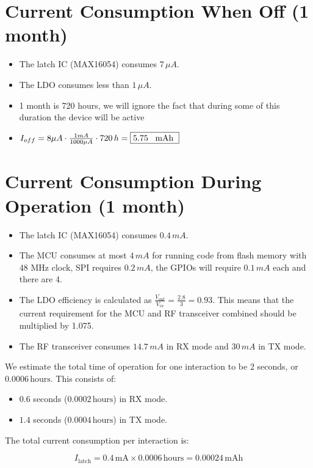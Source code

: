 \documentclass{article}
\begin{document}
\section{Current Consumption When Off (1 month)}
\begin{itemize}
    \item The latch IC (MAX16054) consumes \(7 \, \mu A\).
    \item The LDO consumes less than \(1 \, \mu A\).
    \item 1 month is 720 hours, we will ignore the fact that during some of this duration the device will be active
    \item \(I_{off} = 8 \mu A \cdot \frac{1 mA}{1000 \mu A} \cdot 720 \,  h = \fbox{5.75 \, mAh } \)
\end{itemize}

\section{Current Consumption During Operation (1 month)}
\begin{itemize}
    \item The latch IC (MAX16054) consumes \(0.4 \, mA\).
    \item The MCU consumes at most \(4 \, mA\) for running code from flash memory with 48 MHz clock, SPI requires \(0.2 \, mA\), the GPIOs will require \(0.1 \, mA\) each and there are 4.
    \item The LDO efficiency is calculated as \(\frac{V_{out}}{V_{in}} = \frac{2.8}{3} = 0.93\). This means that the current requirement for the MCU and RF transceiver combined should be multiplied by 1.075. 
    \item The RF transceiver consumes \(14.7 \, mA\) in RX mode and \(30 \, mA\) in TX mode.
\end{itemize}

We estimate the total time of operation for one interaction to be 2 seconds, or \(0.0006 \, \text{hours}\). This consists of:
\begin{itemize}
    \item \(0.6\) seconds (\(0.0002 \, \text{hours}\)) in RX mode.
    \item \(1.4\) seconds (\(0.0004 \, \text{hours}\)) in TX mode.
\end{itemize}

The total current consumption per interaction is:

\[
I_{\text{latch}} = 0.4 \, \text{mA} \times  0.0006 \, \text{hours} = 0.00024 \, \text{mAh}
\]
\end{document}
